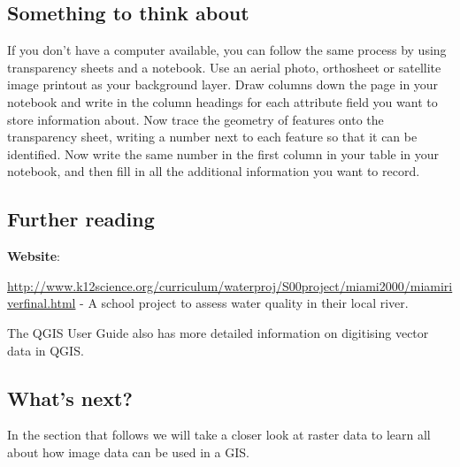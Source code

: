 \subsection{Something to think about}

If you don't have a computer available, you can follow the same process by
using transparency sheets and a notebook. Use an aerial photo, orthosheet or
satellite image printout as your background layer. Draw columns down the page
in your notebook and write in the column headings for each attribute field
you want to store information about. Now trace the geometry of features onto
the transparency sheet, writing a number next to each feature so that it can
be identified. Now write the same number in the first column in your table in
your notebook, and then fill in all the additional information you want to
record.

\subsection{Further reading}

\textbf{Website}:

\url{http://www.k12science.org/curriculum/waterproj/S00project/miami2000/miamiriverfinal.html} - A school project to assess water quality in their local river.

The QGIS User Guide also has more detailed information on digitising vector
data in QGIS.

\subsection{What's next?}

In the section that follows we will take a closer look at raster data to
learn all about how image data can be used in a GIS.






